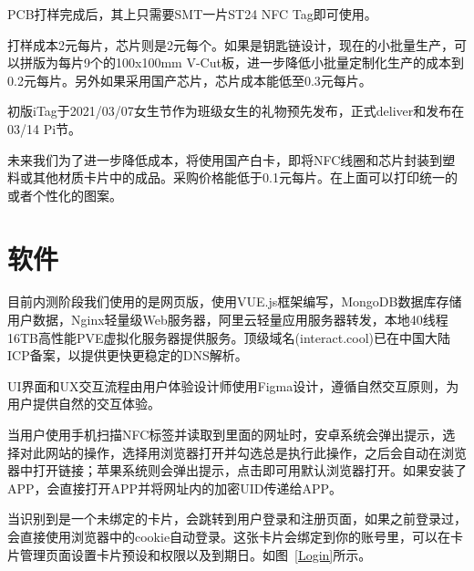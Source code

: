 \documentclass[UTF8]{ctexart}
\begin{document}
PCB打样完成后，其上只需要SMT一片ST24 NFC Tag即可使用。

打样成本2元每片，芯片则是2元每个。如果是钥匙链设计，现在的小批量生产，可以拼版为每片9个的100x100mm V-Cut板，进一步降低小批量定制化生产的成本到0.2元每片。另外如果采用国产芯片，芯片成本能低至0.3元每片。

初版iTag于2021/03/07女生节作为班级女生的礼物预先发布，正式deliver和发布在03/14 Pi节。

未来我们为了进一步降低成本，将使用国产白卡，即将NFC线圈和芯片封装到塑料或其他材质卡片中的成品。采购价格能低于0.1元每片。在上面可以打印统一的或者个性化的图案。

\section{软件}
目前内测阶段我们使用的是网页版，使用VUE.js框架编写，MongoDB数据库存储用户数据，Nginx轻量级Web服务器，阿里云轻量应用服务器转发，本地40线程16TB高性能PVE虚拟化服务器提供服务。顶级域名(interact.cool)已在中国大陆ICP备案，以提供更快更稳定的DNS解析。

UI界面和UX交互流程由用户体验设计师使用Figma设计，遵循自然交互原则，为用户提供自然的交互体验。

当用户使用手机扫描NFC标签并读取到里面的网址时，安卓系统会弹出提示，选择对此网站的操作，选择用浏览器打开并勾选总是执行此操作，之后会自动在浏览器中打开链接；苹果系统则会弹出提示，点击即可用默认浏览器打开。如果安装了APP，会直接打开APP并将网址内的加密UID传递给APP。

当识别到是一个未绑定的卡片，会跳转到用户登录和注册页面，如果之前登录过，会直接使用浏览器中的cookie自动登录。这张卡片会绑定到你的账号里，可以在卡片管理页面设置卡片预设和权限以及到期日。如图~\ref{Login}所示。
\end{document}
